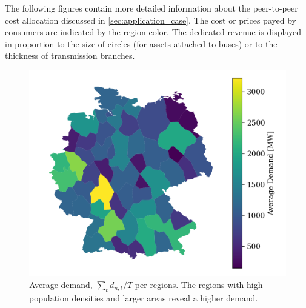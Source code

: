\documentclass[11pt,twocolumn]{article}
\newcommand{\demand}[1][n]{d_{#1,t}}
\begin{document}
The following figures contain more detailed information about the peer-to-peer cost allocation discussed in \cref{sec:application_case}. The cost or prices payed by consumers are indicated by the region color. The dedicated revenue is displayed in proportion to the size of circles (for assets attached to buses) or to the thickness of transmission branches.

\begin{figure}[h]
    \includegraphics[width=\linewidth]{de50/average_demand}
    \caption{Average demand, $\sum_t \demand/T$ per regions. The regions with high population densities and larger areas reveal a higher demand.}
    \label{fig:average_demand}
\end{figure}
\end{document}
